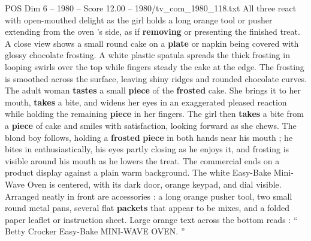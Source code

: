 \begin{textsample}{POS Dim 6 – 1980 – Score 12.00 – 1980/tv\_com\_1980\_118.txt}
All three react with open-mouthed delight as the girl holds a long orange tool or pusher extending from the oven ’s side, as if \textbf{removing} or presenting the finished treat.
A close view shows a small round cake on a \textbf{plate} or napkin being covered with glossy chocolate frosting.
A white plastic spatula spreads the thick frosting in looping swirls over the top while fingers steady the cake at the edge.
The frosting is smoothed across the surface, leaving shiny ridges and rounded chocolate curves.
The adult woman \textbf{tastes} a small \textbf{piece} of the \textbf{frosted} cake.
She brings it to her mouth, \textbf{takes} a bite, and widens her eyes in an exaggerated pleased reaction while holding the remaining \textbf{piece} in her fingers.
The girl then \textbf{takes} a bite from a \textbf{piece} of cake and smiles with satisfaction, looking forward as she chews.
The blond boy follows, holding a \textbf{frosted} \textbf{piece} in both hands near his mouth ; he bites in enthusiastically, his eyes partly closing as he enjoys it, and frosting is visible around his mouth as he lowers the treat.
The commercial ends on a product display against a plain warm background.
The white Easy-Bake Mini-Wave Oven is centered, with its dark door, orange keypad, and dial visible.
Arranged neatly in front are accessories : a long orange pusher tool, two small round metal pans, several flat \textbf{packets} that appear to be mixes, and a folded paper leaflet or instruction sheet.
Large orange text across the bottom reads : “ Betty Crocker Easy-Bake MINI-WAVE OVEN. ”

\end{textsample}
